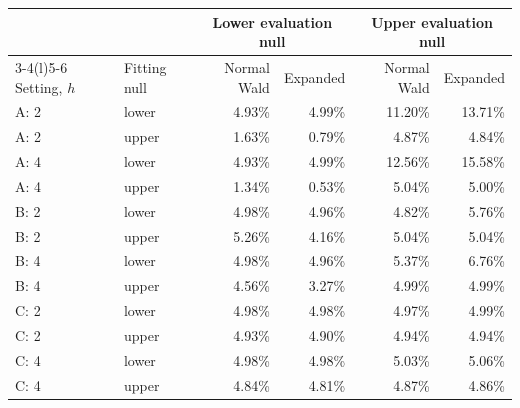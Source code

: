 \begin{tabular}{@{}llrrrr@{}}
\toprule
 & & \multicolumn{2}{c}{Lower evaluation null} & \multicolumn{2}{c}{Upper evaluation null}\\
\cmidrule(lr){3-4}\cmidrule(l){5-6}
Setting, \(h\) & Fitting null & Normal Wald & Expanded & Normal Wald & Expanded\\
\midrule
A: 2 & lower & 4.93\% & 4.99\% & 11.20\% & 13.71\%\\
A: 2 & upper & 1.63\% & 0.79\% & 4.87\% & 4.84\%\\
A: 4 & lower & 4.93\% & 4.99\% & 12.56\% & 15.58\%\\
A: 4 & upper & 1.34\% & 0.53\% & 5.04\% & 5.00\%\\
B: 2 & lower & 4.98\% & 4.96\% & 4.82\% & 5.76\%\\
B: 2 & upper & 5.26\% & 4.16\% & 5.04\% & 5.04\%\\
B: 4 & lower & 4.98\% & 4.96\% & 5.37\% & 6.76\%\\
B: 4 & upper & 4.56\% & 3.27\% & 4.99\% & 4.99\%\\
C: 2 & lower & 4.98\% & 4.98\% & 4.97\% & 4.99\%\\
C: 2 & upper & 4.93\% & 4.90\% & 4.94\% & 4.94\%\\
C: 4 & lower & 4.98\% & 4.98\% & 5.03\% & 5.06\%\\
C: 4 & upper & 4.84\% & 4.81\% & 4.87\% & 4.86\%\\
\bottomrule
\end{tabular}
